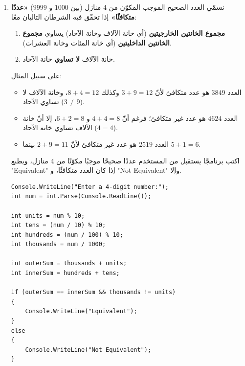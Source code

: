 \documentclass[14pt]{extarticle}
\begin{document}
\begin{enumerate}[resume, itemsep=2.2em]
\item
نسمّي العدد الصحيح الموجب المكوّن من $4$ منازل (بين $1000$ و $9999$) \textbf{«عددًا متكافئًا»} إذا تحقّق فيه الشرطان التاليان معًا:
\begin{enumerate}[nosep]
    \item \textbf{مجموع الخانتين الخارجيتين} (أي خانة الآلاف وخانة الآحاد) يساوي \textbf{مجموع الخانتين الداخليتين} (أي خانة المئات وخانة العشرات).
    \item خانة الآلاف \textbf{لا تساوي} خانة الآحاد.
\end{enumerate}
على سبيل المثال:
\begin{itemize}[nosep]
    \item العدد $3849$ هو عدد متكافئ لأنّ $3 + 9 = 12$ وكذلك $8 + 4 = 12$، وخانة الآلاف لا تساوي الآحاد ($3 \neq 9$).
    \item العدد $4624$ هو عدد غير متكافئ؛ فرغم أنّ $4 + 4 = 8$ و $6 + 2 = 8$، إلا أنّ خانة الآلاف تساوي خانة الآحاد ($4 = 4$).
    \item العدد $2519$ هو عدد غير متكافئ لأنّ $2 + 9 = 11$ بينما $5 + 1 = 6$.
\end{itemize}
اكتب برنامجًا يستقبل من المستخدم عددًا صحيحًا موجبًا مكوّنًا من $4$ منازل، ويطبع \\
 \textenglish{"Equivalent"} إذا كان العدد متكافئًا، و \textenglish{"Not Equivalent"} وإلا.

\ifwithsols
\begin{boxSolution}
\begin{english}
\begin{verbatim}
Console.WriteLine("Enter a 4-digit number:");
int num = int.Parse(Console.ReadLine());

int units = num % 10;
int tens = (num / 10) % 10;
int hundreds = (num / 100) % 10;
int thousands = num / 1000;

int outerSum = thousands + units;
int innerSum = hundreds + tens;

if (outerSum == innerSum && thousands != units)
{
    Console.WriteLine("Equivalent");
}
else
{
    Console.WriteLine("Not Equivalent");
}
\end{verbatim}
\end{english}
\end{boxSolution}
\fi
\filbreak


\end{enumerate}
\end{document}
